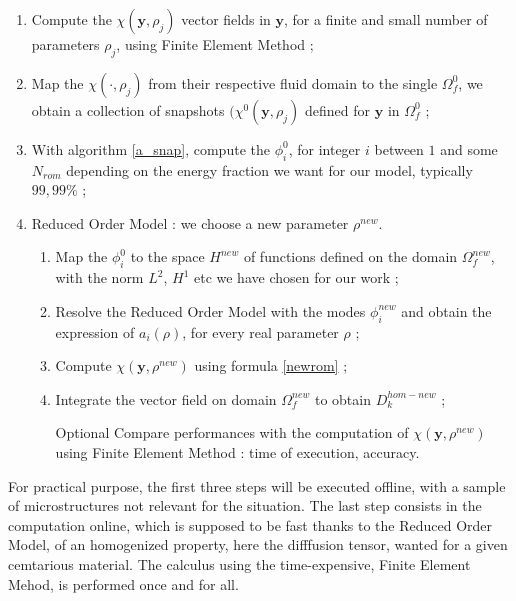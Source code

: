 \begin{algo}\label{a_rom}
\begin{enumerate}[label=\textbf{S \hspace{-7pt} \Roman*}]
\item Compute the $\chi\left(\mathbf{y},\rho_j\right)$ vector fields in $\mathbf{y}$, for a finite and small number of parameters $\rho_j$, %
using Finite Element Method ;
\item Map the $\chi (\cdot,\rho_j)$ from their respective fluid domain to the single $\Omega_f^0$, we obtain a collection of snapshots $(\chi^0(\mathbf{y},\rho_j)$ %
defined for $\mathbf{y}$ in $\Omega_f^0$ ;
\item With algorithm \ref{a_snap}, compute the $\phi^0_i$, for integer $i$ between $1$ and some $N_{rom}$ depending on the energy fraction we want for our model, typically $99,99\%$ ;
\item Reduced Order Model : we choose a new parameter $\rho^{new}$.
\begin{enumerate}[label=(\textbf{se}\ \roman*)]
\item Map the $\phi_i^0$ to the space $H^{new}$ of functions defined on the domain $\Omega_f^{new}$, with the norm $L^2$, $H^1$ etc we have chosen for our work ;
\item Resolve the Reduced Order Model with the modes $\phi_i^{new}$ and obtain the expression of $a_i(\rho)$, for every real parameter $\rho$ ;
\item Compute $\chi(\mathbf{y},\rho^{new})$ using formula \ref{newrom} ;
\item Integrate the vector field on domain $\Omega_f^{new}$ to obtain $D_k^{hom-new}$ ;
\item[Optional] Compare performances with the computation of $\chi(\mathbf{y},\rho^{new})$ using Finite Element Method : %
time of execution, accuracy.
\end{enumerate}
\end{enumerate}
\end{algo}

\medskip
For practical purpose, the first three steps will be executed offline, with a sample of microstructures not relevant for the situation. %
The last step consists in the computation online, which is supposed to be fast thanks to the Reduced Order Model, %
of an homogenized property, here the difffusion tensor, wanted for a given cemtarious material.
The calculus using the time-expensive, Finite Element Mehod, is performed once and for all.
